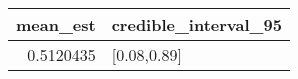 \begin{longtable}{rl}
\toprule
mean\_est & credible\_interval\_95 \\ 
\midrule
0.5120435 & [0.08,0.89] \\ 
\bottomrule
\end{longtable}

